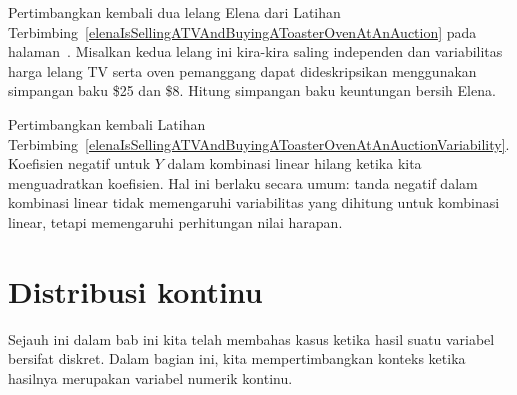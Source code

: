 \begin{exercisewrap}
\begin{nexercise}\label{elenaIsSellingATVAndBuyingAToasterOvenAtAnAuctionVariability}
Pertimbangkan kembali dua lelang Elena dari Latihan Terbimbing~\ref{elenaIsSellingATVAndBuyingAToasterOvenAtAnAuction} pada halaman~\pageref{elenaIsSellingATVAndBuyingAToasterOvenAtAnAuction}. Misalkan kedua lelang ini kira-kira saling independen dan variabilitas harga lelang TV serta oven pemanggang dapat dideskripsikan menggunakan simpangan baku \$25 dan \$8. Hitung simpangan baku keuntungan bersih Elena.\footnotemark
\end{nexercise}
\end{exercisewrap}

Pertimbangkan kembali Latihan Terbimbing~\ref{elenaIsSellingATVAndBuyingAToasterOvenAtAnAuctionVariability}. Koefisien negatif untuk $Y$ dalam kombinasi linear hilang ketika kita menguadratkan koefisien. Hal ini berlaku secara umum: tanda negatif dalam kombinasi linear tidak memengaruhi variabilitas yang dihitung untuk kombinasi linear, tetapi memengaruhi perhitungan nilai harapan.



{}





\section{Distribusi kontinu}
\label{contDist}

\noindent%
Sejauh ini dalam bab ini kita telah membahas kasus
ketika hasil suatu variabel bersifat diskret.
Dalam bagian ini, kita mempertimbangkan konteks ketika
hasilnya merupakan variabel numerik kontinu.

